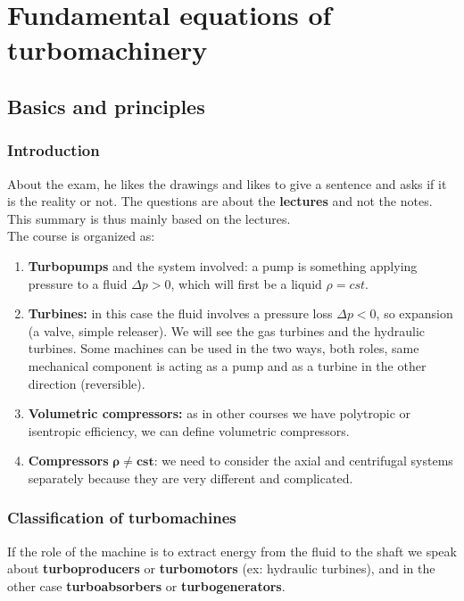 
\chapter{Fundamental equations of turbomachinery}

\section{Basics and principles}
\subsection{Introduction}
	About the exam, he likes the drawings and likes to give a sentence and asks if it is the reality or not. The questions are about the \textbf{lectures} and not the notes. This summary is thus mainly based on the lectures. \\

The course is organized as: 

\begin{enumerate}
\item \textbf{Turbopumps} and the system involved: a pump is something  applying pressure to a fluid $\Delta p > 0$, which will first be a liquid $\rho = cst$.

\item \textbf{Turbines:} in this case the fluid involves a pressure loss $\Delta p < 0$, so expansion (a valve, simple releaser). We will see the gas turbines and the hydraulic turbines. Some machines can be used in the two ways, both roles, same mechanical component is acting as a pump and as a turbine in the other direction (reversible). 

\item \textbf{Volumetric compressors:} as in other courses we have polytropic or isentropic efficiency, we can define volumetric compressors. 

\item \textbf{Compressors} $\bm{\rho \neq cst}$: we need to consider the axial and centrifugal systems separately because they are very different and complicated.   
\end{enumerate}


\subsection{Classification of turbomachines}
If the role of the machine is to extract energy from the fluid to the shaft we speak about \textbf{turboproducers} or \textbf{turbomotors} (ex: hydraulic turbines), and in the other case \textbf{turboabsorbers} or \textbf{turbogenerators}. 

